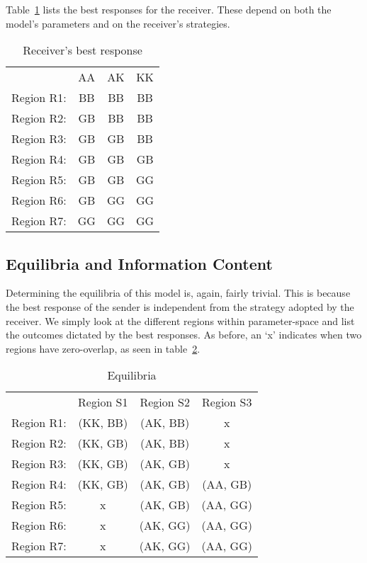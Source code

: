 \documentclass[a4paper,12pt]{article}
\numberwithin{equation}{section}
\begin{document}
Table~\ref{tab:CueGamewithConditionalAmplification/BestResponseR} lists the best responses for the receiver. These depend on both the model's parameters and on the receiver's strategies.

\begin{table}[h]
\begin{center}
\begin{tabular}{lccc}
 & AA & AK & KK\\
Region R1: & BB & BB & BB\\
Region R2: & GB & BB & BB\\
Region R3: & GB & GB & BB\\
Region R4: & GB & GB & GB\\
Region R5: & GB & GB & GG\\
Region R6: & GB & GG & GG\\
Region R7: & GG & GG & GG
\end{tabular}
\end{center}
\caption{Receiver's best response}
\label{tab:CueGamewithConditionalAmplification/BestResponseR}
\end{table}


\subsection{Equilibria and Information Content}
\label{sec:Cue Game with Conditional Amplification/Equilibria}

Determining the equilibria of this model is, again, fairly trivial. This is because the best response of the sender is independent from the strategy adopted by the receiver. We simply look at the different regions within parameter-space and list the outcomes dictated by the best responses. As before, an `x' indicates when two regions have zero-overlap, as seen in table~\ref{tab:CueGamewithConditionalAmplification/Equilibria}.

\begin{table}[h]
\begin{center}
\begin{tabular}{lccc}
 & Region S1 & Region S2 & Region S3\\
Region R1: & (KK, BB) & (AK, BB) & x\\
Region R2: & (KK, GB) & (AK, BB) & x\\
Region R3: & (KK, GB) & (AK, GB) & x\\
Region R4: & (KK, GB) & (AK, GB) & (AA, GB)\\
Region R5: & x & (AK, GB) & (AA, GG)\\
Region R6: & x & (AK, GG) & (AA, GG)\\
Region R7: & x & (AK, GG) & (AA, GG)
\end{tabular}
\end{center}
\caption{Equilibria}
\label{tab:CueGamewithConditionalAmplification/Equilibria}
\end{table}
\end{document}
